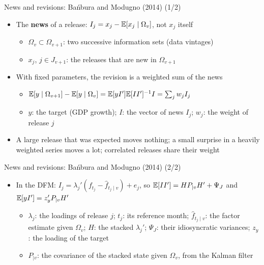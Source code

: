 \begin{frame}{News and revisions: Bańbura and Modugno (2014) (1/2)}
\itemsize{\small}
\begin{itemize}
    \item The \textbf{news} of a release: $I_j = x_j - \mathbb{E}[x_j\mid\Omega_v]$, not $x_j$ itself
    \begin{itemize}
        \item $\Omega_v \subset \Omega_{v+1}$: two successive information sets (data vintages)
        \item $x_j$, $j \in J_{v+1}$: the releases that are new in $\Omega_{v+1}$
    \end{itemize}
    \item With fixed parameters, the revision is a weighted sum of the news 
    \begin{itemize}
        \item $\mathbb{E}[y\mid\Omega_{v+1}] - \mathbb{E}[y\mid\Omega_v] = \mathbb{E}[yI']\mathbb{E}[II']^{-1}I = \sum_j w_jI_j$
        \item $y$: the target (GDP growth); $I$: the vector of news $I_j$; $w_j$: the weight of release $j$
    \end{itemize}
    \item A large release that was expected moves nothing; a small surprise in a heavily weighted series moves a lot; correlated releases share their weight
\end{itemize}
\end{frame}

\begin{frame}{News and revisions: Bańbura and Modugno (2014) (2/2)}
\itemsize{\small}
\begin{itemize}
    \item In the DFM: $I_j = \lambda_j'(f_{t_j} - \hat f_{t_j\mid v}) + e_j$, so $\mathbb{E}[II'] = H P_{\mid v}H' + \Psi_J$ and $\mathbb{E}[yI'] = z_y'P_{\mid v}H'$
    \begin{itemize}
        \item $\lambda_j$: the loadings of release $j$; $t_j$: its reference month; $\hat f_{t_j\mid v}$: the factor estimate given $\Omega_v$; $H$: the stacked $\lambda_j'$; $\Psi_J$: their idiosyncratic variances; $z_y$: the loading of the target
        \item $P_{\mid v}$: the covariance of the stacked state given $\Omega_v$, from the Kalman filter
    \end{itemize}
\end{itemize}
\end{frame}

